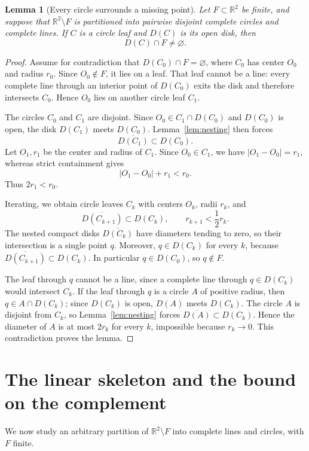 \documentclass[11pt]{article}
\newtheorem{lemma}[theorem]{Lemma}
\newcommand{\R}{\mathbb{R}}
\newcommand{\ol}{\overline}
\begin{document}
\begin{lemma}[Every circle surrounds a missing point]\label{lem:puncture-inside}
Let $F\subset\R^2$ be finite, and suppose that $\R^2\setminus F$ is partitioned into pairwise disjoint complete circles and complete lines. If $C$ is a circle leaf and $D(C)$ is its open disk, then
\[
D(C)\cap F\neq\varnothing.
\]
\end{lemma}

\begin{proof}
Assume for contradiction that $D(C_0)\cap F=\varnothing$, where $C_0$ has center $O_0$ and radius $r_0$. Since $O_0\notin F$, it lies on a leaf. That leaf cannot be a line: every complete line through an interior point of $D(C_0)$ exits the disk and therefore intersects $C_0$. Hence $O_0$ lies on another circle leaf $C_1$.

The circles $C_0$ and $C_1$ are disjoint. Since $O_0\in C_1\cap D(C_0)$ and $D(C_0)$ is open, the disk $D(C_1)$ meets $D(C_0)$. Lemma~\ref{lem:nesting} then forces
\[
\ol{D(C_1)}\subset D(C_0).
\]
Let $O_1,r_1$ be the center and radius of $C_1$. Since $O_0\in C_1$, we have $|O_1-O_0|=r_1$, whereas strict containment gives
\[
|O_1-O_0|+r_1<r_0.
\]
Thus $2r_1<r_0$.

Iterating, we obtain circle leaves $C_k$ with centers $O_k$, radii $r_k$, and
\[
\ol{D(C_{k+1})}\subset D(C_k),
\qquad
r_{k+1}<\frac12r_k.
\]
The nested compact disks $\ol{D(C_k)}$ have diameters tending to zero, so their intersection is a single point $q$. Moreover, $q\in D(C_k)$ for every $k$, because $\ol{D(C_{k+1})}\subset D(C_k)$. In particular $q\in D(C_0)$, so $q\notin F$.

The leaf through $q$ cannot be a line, since a complete line through $q\in D(C_k)$ would intersect $C_k$. If the leaf through $q$ is a circle $A$ of positive radius, then $q\in A\cap D(C_k)$; since $D(C_k)$ is open, $D(A)$ meets $D(C_k)$. The circle $A$ is disjoint from $C_k$, so Lemma~\ref{lem:nesting} forces $\ol{D(A)}\subset D(C_k)$. Hence the diameter of $A$ is at most $2r_k$ for every $k$, impossible because $r_k\to0$. This contradiction proves the lemma.
\end{proof}

\section{The linear skeleton and the bound on the complement}

We now study an arbitrary partition of $\R^2\setminus F$ into complete lines and circles, with $F$ finite.
\end{document}
